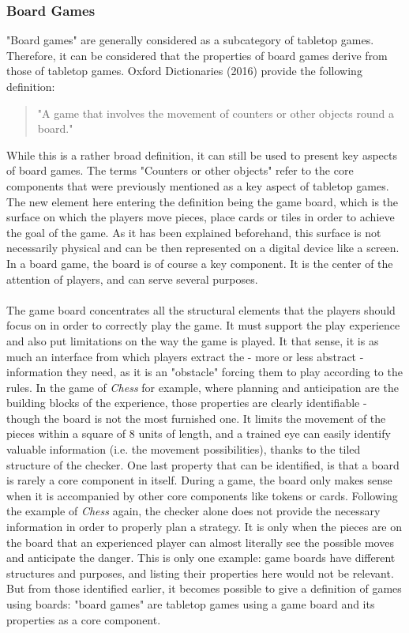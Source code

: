 \subsubsection{Board Games}
"Board games" are generally considered as a subcategory of tabletop games. Therefore, it can be considered that the properties of board games derive from those of tabletop games. Oxford Dictionaries (2016) provide the following definition:
\begin{quotation}
"A game that involves the movement of counters or other objects round a board."
\end{quotation}
While this is a rather broad definition, it can still be used to present key aspects of board games. The terms "Counters or other objects" refer to the core components that were previously mentioned as a key aspect of tabletop games. The new element here entering the definition being the game board, which is the surface on which the players move pieces, place cards or tiles in order to achieve the goal of the game. As it has been explained beforehand, this surface is not necessarily physical and can be then represented on a digital device like a screen. In a board game, the board is of course a key component. It is the center of the attention of players, and can serve several purposes.
\\\\
The game board concentrates all the structural elements that the players should focus on in order to correctly play the game. It must support the play experience and also put limitations on the way the game is played. It that sense, it is as much an interface from which players extract the - more or less abstract - information they need, as it is an "obstacle" forcing them to play according to the rules. In the game of \textit{Chess} for example, where planning and anticipation are the building blocks of the experience, those properties are clearly identifiable - though the board is not the most furnished one. It limits the movement of the pieces within a square of 8 units of length, and a trained eye can easily identify valuable information (i.e. the movement possibilities), thanks to the tiled structure of the checker. One last property that can be identified, is that a board is rarely a core component in itself. During a game, the board only makes sense when it is accompanied by other core components like tokens or cards. Following the example of  \textit{Chess} again, the checker alone does not provide the necessary information in order to properly plan a strategy. It is only when the pieces are on the board that an experienced player can almost literally see the possible moves and anticipate the danger. This is only one example: game boards have different structures and purposes, and listing their properties here would not be relevant. But from those identified earlier, it becomes possible to give a definition of games using boards: "board games" are tabletop games using a game board and its properties as a core component.
